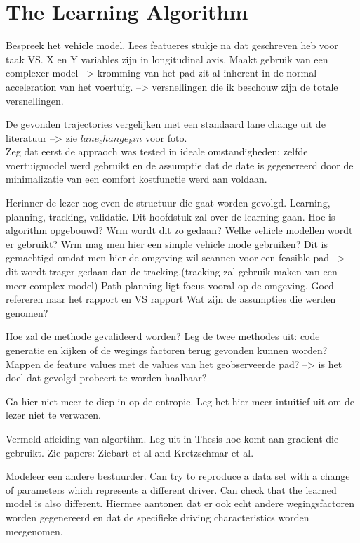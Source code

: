 \chapter{The Learning Algorithm\\}
\label{cha:2}

Bespreek het vehicle model. Lees featueres stukje na dat geschreven heb voor taak VS. X en Y variables zijn in longitudinal axis. Maakt gebruik van een complexer model --> kromming van het pad zit al inherent in de normal acceleration van het voertuig. --> versnellingen die ik beschouw zijn de totale versnellingen. 


De gevonden trajectories vergelijken met een standaard lane change uit de literatuur --> zie $lane_change_kin$ voor foto. \\

Zeg dat eerst de appraoch was tested in ideale omstandigheden: zelfde voertuigmodel werd gebruikt en de assumptie dat de date is gegenereerd door de minimalizatie van een comfort kostfunctie werd aan voldaan. 


Herinner de lezer nog even de structuur die gaat worden gevolgd. 
Learning, planning, tracking, validatie.
Dit hoofdstuk zal over de learning gaan.
Hoe is algorithm opgebouwd? Wrm wordt dit zo gedaan?
Welke vehicle modellen wordt er gebruikt? Wrm mag men hier een simple vehicle mode gebruiken?
Dit is gemachtigd omdat men hier de omgeving wil scannen voor een feasible pad --> dit wordt trager gedaan dan de tracking.(tracking zal gebruik maken van een meer complex model) Path planning ligt focus vooral op de omgeving.
Goed refereren naar het rapport en VS rapport
Wat zijn de assumpties die werden genomen?

Hoe zal de methode gevalideerd worden? Leg de twee methodes uit: code generatie en kijken of de wegings factoren terug gevonden kunnen worden? Mappen de feature values met de values van het geobserveerde pad? --> is het doel dat gevolgd probeert te worden haalbaar? 

Ga hier niet meer te diep in op de entropie. Leg het hier meer intuitief uit om de lezer niet te verwaren. 

Vermeld afleiding van algortihm. Leg uit in Thesis hoe komt aan gradient die gebruikt. Zie papers: Ziebart et al and Kretzschmar et al.

Modeleer een andere bestuurder. Can try to reproduce a data set with a change of parameters which represents a different driver. Can check that the learned model is also different. Hiermee aantonen dat er ook echt andere wegingsfactoren worden gegenereerd en dat de specifieke driving characteristics worden meegenomen.

